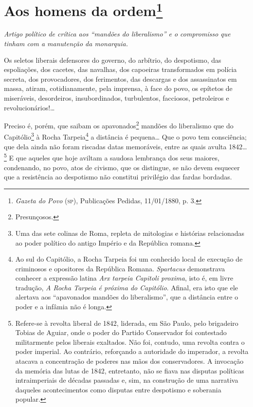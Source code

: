 \chapter{Aos homens da ordem\footnote{\emph{Gazeta do Povo}
  (\textsc{sp}), Publicações Pedidas, 11/01/1880, p. 3.}}

\begin{resumo}
\emph{Artigo político de crítica aos ``mandões do liberalismo'' e o
compromisso que tinham com a manutenção da monarquia.}
\end{resumo}


Os seletos liberais defensores do governo, do arbítrio, do despotismo,
das espoliações, dos cacetes, das navalhas, dos capoeiras transformados
em polícia secreta, dos provocadores, dos ferimentos, das descargas e
dos assassinatos em massa, atiram, cotidianamente, pela imprensa, à face
do povo, os epítetos de miseráveis, desordeiros, insubordinados,
turbulentos, facciosos, petroleiros e revolucionários!\ldots{}

Preciso é, porém, que saibam os apavonados\footnote{Presunçosos.}
mandões do liberalismo que do Capitólio\footnote{Uma das sete colinas
  de Roma, repleta de mitologias e histórias relacionadas ao poder
  político do antigo Império e da República romana.} à Rocha
Tarpeia\footnote{Ao sul do Capitólio, a Rocha Tarpeia foi um conhecido
  local de execução de criminosos e opositores da República Romana.
  \emph{Spartacus} demonstrava conhecer a expressão latina \emph{Arx
  tarpeia Capitoli proxima}, isto é, em livre tradução, \emph{A Rocha
  Tarpeia é próxima do Capitólio}. Afinal, era isto que ele alertava aos
  ``apavonados mandões do liberalismo'', que a distância entre o poder e a
  infâmia não é longa.} a distância é pequena\ldots{} Que o povo tem
consciência; que dela ainda não foram riscadas datas memoráveis, entre
as quais avulta 1842\ldots{}\footnote{Refere-se à revolta liberal de 1842,
  liderada, em São Paulo, pelo brigadeiro Tobias de Aguiar, onde o poder
  do Partido Conservador foi contestado militarmente pelos liberais
  exaltados. Não foi, contudo, uma revolta contra o poder imperial. Ao
  contrário, reforçando a autoridade do imperador, a revolta atacava a
  concentração de poderes nas mãos dos conservadores. A invocação da
  memória das lutas de 1842, entretanto, não se fiava nas disputas
  políticas intraimperiais de décadas passadas e, sim, na construção de
  uma narrativa daqueles acontecimentos como disputas entre despotismo e
  soberania popular.} E que
aqueles que hoje aviltam a saudosa lembrança dos seus maiores,
condenando, no povo, atos de civismo, que os distingue, se não devem
esquecer que a resistência ao despotismo não constitui privilégio das
fardas bordadas.

